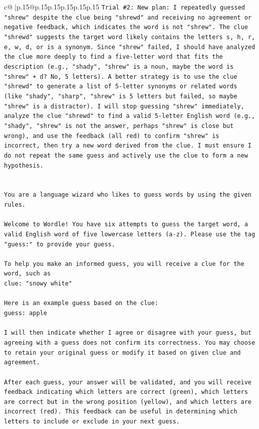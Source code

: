 \documentclass{article}
\begin{document}
{\begin{supertabular}{c@{$\;$}|p{.15\linewidth}@{}p{.15\linewidth}p{.15\linewidth}p{.15\linewidth}p{.15\linewidth}p{.15\linewidth}}
{{{\texttt{Trial \#2: New plan: I repeatedly guessed "shrew" despite the clue being "shrewd" and receiving no agreement or negative feedback, which indicates the word is not "shrew". The clue "shrewd" suggests the target word likely contains the letters s, h, r, e, w, d, or is a synonym. Since "shrew" failed, I should have analyzed the clue more deeply to find a five{-}letter word that fits the description (e.g., "shady", "shrew" is a noun, maybe the word is "shrew" + d? No, 5 letters). A better strategy is to use the clue "shrewd" to generate a list of 5{-}letter synonyms or related words (like "shady", "sharp", "shrew" is 5 letters but failed, so maybe "shrew" is a distractor). I will stop guessing "shrew" immediately, analyze the clue "shrewd" to find a valid 5{-}letter English word (e.g., "shady", "shrew" is not the answer, perhaps "shrew" is close but wrong), and use the feedback (all red) to confirm "shrew" is incorrect, then try a new word derived from the clue. I must ensure I do not repeat the same guess and actively use the clue to form a new hypothesis.} \\
\\ 
\\ 
\texttt{You are a language wizard who likes to guess words by using the given rules.} \\
\\ 
\texttt{Welcome to Wordle! You have six attempts to guess the target word, a valid English word of five lowercase letters (a{-}z). Please use the tag "guess:" to provide your guess.} \\
\\ 
\texttt{To help you make an informed guess, you will receive a clue for the word, such as} \\
\texttt{clue: "snowy white"} \\
\\ 
\texttt{Here is an example guess based on the clue: } \\
\texttt{guess: apple} \\
\\ 
\texttt{I will then indicate whether I agree or disagree with your guess, but agreeing with a guess does not confirm its correctness. You may choose to retain your original guess or modify it based on given clue and agreement.} \\
\\ 
\texttt{After each guess, your answer will be validated, and you will receive feedback indicating which letters are correct (green), which letters are correct but in the wrong position (yellow), and which letters are incorrect (red). This feedback can be useful in determining which letters to include or exclude in your next guess.} \\
}}}
\end{supertabular}}
\end{document}
